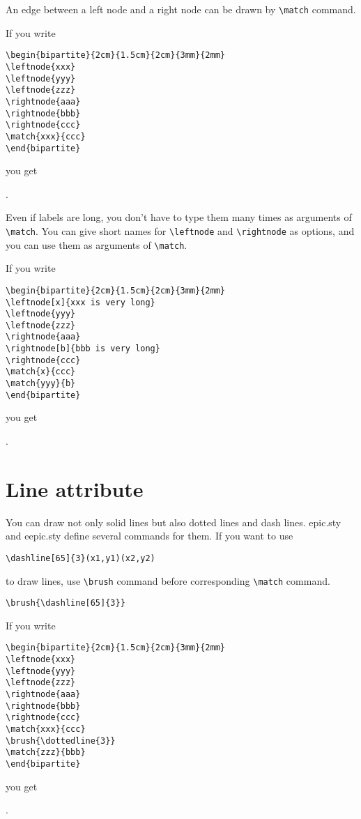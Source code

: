 An edge between a left node and a right node can be drawn
by \verb|\match| command.

If you write
\begin{verbatim}
\begin{bipartite}{2cm}{1.5cm}{2cm}{3mm}{2mm}
\leftnode{xxx}
\leftnode{yyy}
\leftnode{zzz}
\rightnode{aaa}
\rightnode{bbb}
\rightnode{ccc}
\match{xxx}{ccc}
\end{bipartite}
\end{verbatim}
you get
\begin{bipartite}{2cm}{1.5cm}{2cm}{3mm}{2mm}
\end{bipartite}.

Even if labels are long,
you don't have to type them many times as arguments of \verb|\match|.
You can give short names for
\verb|\leftnode| and \verb|\rightnode| as options,
and you can use them as arguments of \verb|\match|.

If you write
\begin{verbatim}
\begin{bipartite}{2cm}{1.5cm}{2cm}{3mm}{2mm}
\leftnode[x]{xxx is very long}
\leftnode{yyy}
\leftnode{zzz}
\rightnode{aaa}
\rightnode[b]{bbb is very long}
\rightnode{ccc}
\match{x}{ccc}
\match{yyy}{b}
\end{bipartite}
\end{verbatim}
you get
\begin{bipartite}{2cm}{1.5cm}{2cm}{3mm}{2mm}
\end{bipartite}.


\section{Line attribute}
You can draw not only solid lines but also
dotted lines and dash lines.
epic.sty and eepic.sty define several commands for them.
If you want to use
\begin{verbatim}
\dashline[65]{3}(x1,y1)(x2,y2)
\end{verbatim}
to draw lines, use \verb|\brush| command
before corresponding \verb|\match| command.
\begin{verbatim}
\brush{\dashline[65]{3}}
\end{verbatim}

If you write
\begin{verbatim}
\begin{bipartite}{2cm}{1.5cm}{2cm}{3mm}{2mm}
\leftnode{xxx}
\leftnode{yyy}
\leftnode{zzz}
\rightnode{aaa}
\rightnode{bbb}
\rightnode{ccc}
\match{xxx}{ccc}
\brush{\dottedline{3}}
\match{zzz}{bbb}
\end{bipartite}
\end{verbatim}
you get
\begin{bipartite}{2cm}{1.5cm}{2cm}{3mm}{2mm}
\end{bipartite}.



